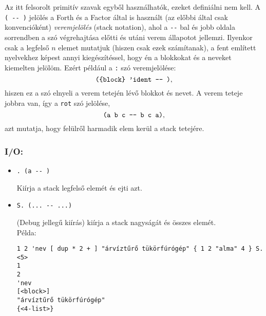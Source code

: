 \documentclass[a4paper]{article}
\begin{document}
Az itt felsorolt primitív szavak egyből használhatók, ezeket definiálni nem kell. A \verb|( -- )| jelölés a Forth és a Factor által is használt (az előbbi által csak konvencióként) {\it veremjelölés} (stack notation), ahol a  \verb|--| bal és jobb oldala sorrendben a szó végrehajtása előtti és utáni verem állapotot jellemzi. Ilyenkor csak a legfelső $n$ elemet mutatjuk (hiszen csak ezek számítanak), a fent említett nyelvekhez képest annyi kiegészítéssel, hogy én a blokkokat és a neveket kiemelten jelölöm. Ezért például a \verb|:| szó veremjelölése: $$\verb|({block} 'ident -- )|,$$ hiszen ez a szó elnyeli a verem tetején lévő blokkot és nevet. A verem teteje jobbra van, így a \verb|rot| szó jelölése, $$\verb|(a b c -- b c a)|,$$ azt mutatja, hogy felülről harmadik elem kerül a stack tetejére.
\subsubsection*{I/O:}
\begin{itemize}
\item \begin{verbatim}. (a -- )\end{verbatim} Kiírja a stack legfelső elemét és ejti azt.
\item \begin{verbatim}S. (... -- ...)\end{verbatim} (Debug jellegű kiírás) kiírja a stack nagyságát és összes elemét.\\
Példa: \begin{verbatim}1 2 'nev [ dup * 2 + ] "árvíztűrő tükörfúrógép" { 1 2 "alma" 4 } S.
<5>
1
2
'nev
[<block>]
"árvíztűrő tükörfúrógép"
{<4-list>}
\end{verbatim}
\end{itemize}
\end{document}
